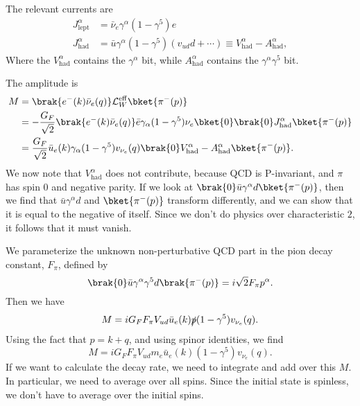 \documentclass[a4paper]{article}
\begin{document}
The relevant currents are
\begin{align*}
  J_{\mathrm{lept}}^\alpha &= \bar{\nu}_e \gamma^\alpha (1 - \gamma^5) e\\
  J_{\mathrm{had}}^\alpha &= \bar{u} \gamma^\alpha (1 - \gamma^5)(v_{ud} d + \cdots) \equiv V_{\mathrm{had}}^\alpha - A_{\mathrm{had}}^\alpha,
\end{align*}
Where the $V_{\mathrm{had}}^\alpha$ contains the $\gamma^\alpha$ bit, while $A_{\mathrm{had}}^\alpha$ contains the $\gamma^\alpha \gamma^5$ bit.

The amplitude is
\begin{align*}
  M &= \brak{e^-(k) \bar{\nu}_e (q)} \mathcal{L}_W^{\mathrm{eff}} \bket{\pi^-(p)}\\
  &= - \frac{G_F}{\sqrt{2}} \brak{e^-(k) \bar{\nu}_e(q)} \bar{e} \gamma_\alpha (1 - \gamma^5) \nu_e \bket{0} \brak{0} J_{\mathrm{had}}^\alpha \bket{\pi^-(p)}\\
  &= \frac{G_F}{\sqrt{2}} \bar{u}_e (k) \gamma_\alpha(1 - \gamma^5) v_{\nu_e}(q) \brak{0} V_{\mathrm{had}}^\alpha - A_{\mathrm{had}}^\alpha \bket{\pi^-(p)}.
\end{align*}
We now note that $V_{\mathrm{had}}^\alpha$ does not contribute, because QCD is P-invariant, and $\pi$ has spin $0$ and negative parity. If we look at $\brak{0}\bar{u} \gamma^\alpha d \bket{\pi^-(p)}$, then we find that $\bar{u} \gamma^\alpha d$ and $\bket{\pi^-(p)}$ transform differently, and we can show that it is equal to the negative of itself. Since we don't do physics over characteristic $2$, it follows that it must vanish.

We parameterize the unknown non-perturbative QCD part in the pion decay constant, $F_\pi$, defined by
\[
  \brak{0} \bar{u} \gamma^\alpha \gamma^5 d \brak{\pi^-(p)} = i \sqrt{2} F_\pi p^\alpha.
\]
Then we have
\[
  M = i G_F F_\pi V_{ud} \bar{u}_e(k) \slashed p (1 - \gamma^5) v_{\nu_e}(q).
\]
Using the fact that $p = k + q$, and using spinor identities, we find
\[
  M = i G_F F_\pi V_{ud} m_e \bar{u}_e(k) (1 - \gamma^5) v_{\nu_e}(q).
\]
If we want to calculate the decay rate, we need to integrate and add over this $M$. In particular, we need to average over all spins. Since the initial state is spinless, we don't have to average over the initial spins.
\end{document}
